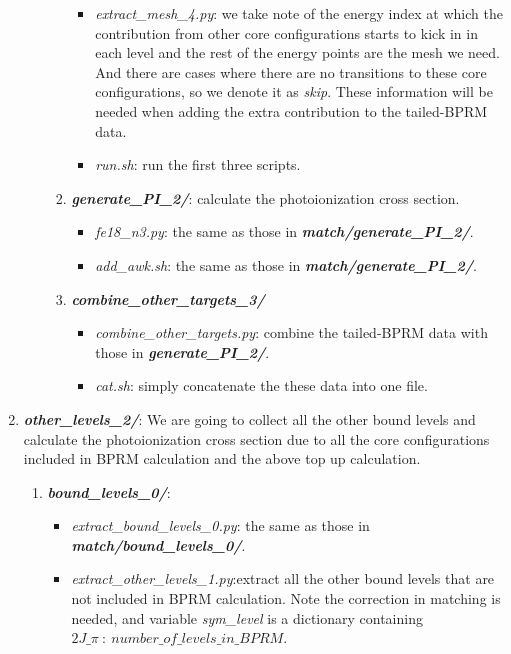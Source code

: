 \begin{enumerate}
\begin{enumerate}
\begin{enumerate}
\begin{itemize}
							\item \textit{extract\_mesh\_4.py}: we take note of the energy index at which the contribution from other core configurations starts to kick in in each level and the rest of the energy points are the mesh we need. And there are cases where there are no transitions to these core configurations, so we denote it as \textit{skip}. These information will be needed when adding the extra contribution to the tailed-BPRM data.
							\item \textit{run.sh}: run the first three scripts.
						\end{itemize}
					\item \textbf{\textit{generate\_PI\_2/}}: calculate the photoionization cross section.
						\begin{itemize}
							\item \textit{fe18\_n3.py}: the same as those in \textbf{\textit{match/generate\_PI\_2/}}.		
							\item \textit{add\_awk.sh}: the same as those in \textbf{\textit{match/generate\_PI\_2/}}.
						\end{itemize}
					\item \textbf{\textit{combine\_other\_targets\_3/}}
						\begin{itemize}
						\item \textit{combine\_other\_targets.py}: combine the tailed-BPRM data with those in \textbf{\textit{generate\_PI\_2/}}.	
						\item \textit{cat.sh}: simply concatenate the these data into one file.
					\end{itemize}
				\end{enumerate}
		\end{enumerate}
	\item \textbf{\textit{other\_levels\_2/}}: We are going to collect all the other bound levels and calculate the photoionization cross section due to all the core configurations included in BPRM calculation and the above top up calculation.
		\begin{enumerate}
			\item \textbf{\textit{bound\_levels\_0/}}: 
				\begin{itemize}
					\item \textit{extract\_bound\_levels\_0.py}: the same as those in \textbf{\textit{match/bound\_levels\_0/}}.		
					\item \textit{extract\_other\_levels\_1.py}:extract all the other bound levels that are not included in BPRM calculation. Note the correction in matching is needed, and variable \textit{sym\_level} is a dictionary containing $2J\_\pi~:~number\_of\_levels\_in\_BPRM$.

\end{itemize}
\end{enumerate}
\end{enumerate}
